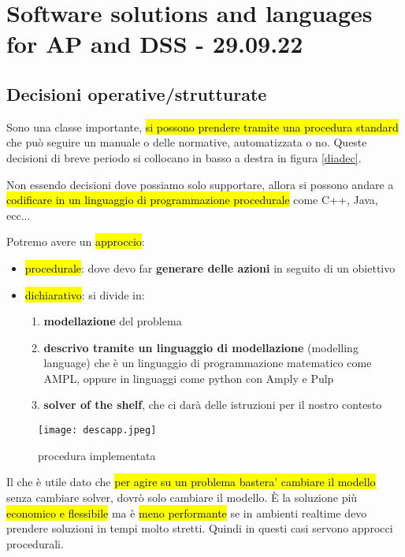 
\section{Software solutions and languages for AP and DSS - 29.09.22}


\subsection{Decisioni operative/strutturate}

Sono una classe importante, \hl{si possono prendere tramite una procedura standard} che può seguire un manuale o delle normative, automatizzata o no. Queste decisioni di breve periodo si collocano in basso a destra in figura  \ref{diadec}.

Non essendo decisioni dove possiamo solo supportare, allora si possono andare a \hl{codificare in un linguaggio di programmazione procedurale} come C++, Java, ecc...

Potremo avere un \hl{approccio}:

\begin{itemize}
	\item \hl{procedurale}: dove devo far \textbf{generare delle azioni} in seguito di un obiettivo
	
	\item \hl{dichiarativo}: si divide in:
		\begin{enumerate}
			\item \textbf{modellazione} del problema
			
			\item \textbf{descrivo tramite un linguaggio di modellazione} (modelling language) che è un linguaggio di programmazione matematico come AMPL, oppure in linguaggi come python con Amply e Pulp
			
			\item \textbf{solver of the shelf}, che ci darà delle istruzioni per il nostro contesto
		\end{enumerate}
\end{itemize}


\begin{figure}[H]
\centering
\texttt{[image: descapp.jpeg]}
\caption{procedura implementata} 
\label{descapp}
\end{figure}


Il che è utile dato che \hl{per agire su un problema bastera' cambiare il modello} senza cambiare solver, dovrò solo cambiare il modello. È la soluzione più \hl{economico e flessibile} ma è \hl{meno performante} se in ambienti realtime devo prendere soluzioni in tempi molto stretti. Quindi in questi casi servono approcci procedurali.

